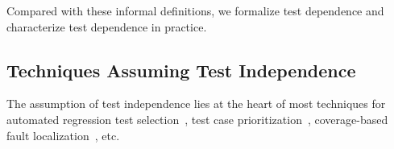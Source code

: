 Compared with these informal definitions,
we formalize test dependence and characterize 
test dependence in practice.



\subsection{Techniques Assuming Test Independence}

The assumption of test independence lies at the heart of most
techniques for automated regression test selection~\cite{harroldetal:OOPSLA:2001, Orso:2004:SRT,
Briand:2009:ART, Zhang:2012:RMT},
test case prioritization~\cite{Elbaum:2000:PTC:347324.348910, Kim:2002:HTP:581339.581357, Rummel:2005:TPR:1066677.1067016, Srivastava:2002:EPT:566172.566187, Jiang:2009:ART}, coverage-based
fault localization~\cite{Steimann:2013}, etc. 


